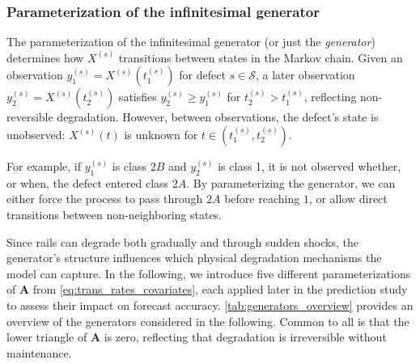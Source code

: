 \documentclass{article}
\begin{document}
\subsubsection{Parameterization of the infinitesimal generator} \label{sec:generator_params}
The parameterization of the infinitesimal generator (or just the \textit{generator}) determines how $X^{(s)}$ transitions between states in the Markov chain. 
Given an observation $y_1^{(s)} = X^{(s)}\left(t_1^{(s)}\right)$ for defect $s \in \mathcal{S}$, a later observation $y_2^{(s)} = X^{(s)}\left(t_2^{(s)}\right)$ satisfies $y_2^{(s)} \geq y_1^{(s)}$ for $t_2^{(s)} > t_1^{(s)}$, reflecting non-reversible degradation. However, between observations, the defect’s state is unobserved: $X^{(s)}(t)$ is unknown for $t \in \left(t_1^{(s)}, t_2^{(s)}\right)$.

For example, if $y_1^{(s)}$ is class $2B$ and $y_2^{(s)}$ is class 1, it is not observed whether, or when, the defect entered class $2A$. By parameterizing the generator, we can either force the process to pass through $2A$ before reaching $1$, or allow direct transitions between non-neighboring states. 

Since rails can degrade both gradually and through sudden shocks, the generator’s structure influences which physical degradation mechanisms the model can capture. In the following, we introduce five different parameterizations of $\bm{A}$ from \cref{eq:trans_rates_covariates}, each applied later in the prediction study to assess their impact on forecast accuracy. \cref{tab:generators_overview} provides an overview of the generators considered in the following. Common to all is that the lower triangle of $\bm{A}$ is zero, reflecting that degradation is irreversible without maintenance.
\end{document}
